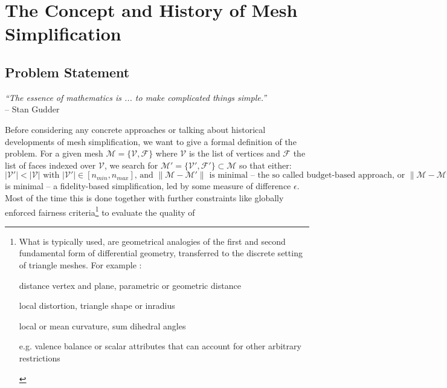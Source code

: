 \chapter{The Concept and History of Mesh Simplification}
\label{simplification0}

\section{Problem Statement}
\label{simplification1}

\begin{flushright}
\textit{``The essence of mathematics is ... to make complicated things simple.''}\\
-- Stan Gudder
\end{flushright}

Before considering any concrete approaches or talking about historical developments of mesh simplification, we want to give a formal definition of the problem.
For a given mesh $\mathcal{M} = \{\mathcal{V},\mathcal{F}\}$ where $\mathcal{V}$ is the list of vertices and $\mathcal{F}$ the list of faces indexed over $\mathcal{V}$, we search for $\mathcal{M'=\{\mathcal{V'},\mathcal{F'}\} \subset M}$ so that either:
$|\mathcal{V'}|<|\mathcal{V}| \text{ with } |\mathcal{V'}| \in [n_{min}, n_{max}] \text{, and } \|\mathcal{M}-\mathcal{M'}\| \text{ is minimal -- the so called budget-based approach, or } \|\mathcal{M}-\mathcal{M'}\| < \epsilon \text{ and } |\mathcal{V'}| $ is minimal -- a fidelity-based simplification, led by some measure of difference $\epsilon$.
Most of the time this is done together with further constraints like globally enforced fairness criteria\footnote{ What is typically used, are geometrical analogies of the first and second fundamental form of differential geometry, transferred to the discrete setting of triangle meshes. For example \citep[cf.][]{Schroder2003}:
\begin{itemize}
{\setlength\itemindent{14pt} \item[Order 0: ] distance vertex and plane, parametric or geometric distance}
{\setlength\itemindent{14pt} \item[Order 1: ] local distortion, triangle shape or inradius}
{\setlength\itemindent{14pt} \item[Order 2: ] local or mean curvature, sum dihedral angles}
{\setlength\itemindent{14pt} \item[No order: ] e.g. valence balance or scalar attributes that can account for other arbitrary restrictions}
\end{itemize}} to evaluate the quality of

